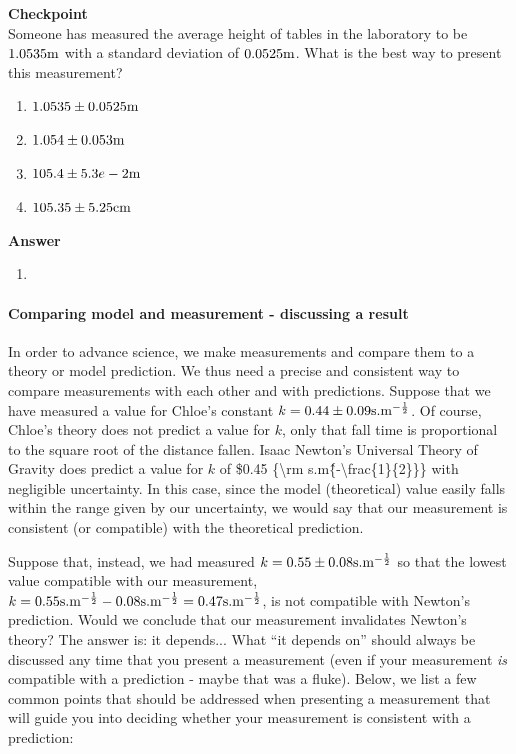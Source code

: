 \begin{framed}
\textbf{Checkpoint}\\
Someone has measured the average height of tables in the laboratory to be $1.0535 {\rm m}$ with a standard deviation of $0.0525 {\rm m}$. What is the best way to present this measurement?

\begin{enumerate}
\item $1.0535\pm 0.0525 {\rm m}$
\item $1.054\pm 0.053 {\rm m}$
\item $105.4\pm 5.3e -2 {\rm m}$
\item $105.35\pm 5.25 {\rm cm}$
\end{enumerate}

\begin{framed}
\textbf{Answer}\\
\begin{enumerate}[resume]
\item
\end{enumerate}
\end{framed}
\end{framed}

\paragraph{Comparing model and measurement - discussing a result}

In order to advance science, we make measurements and compare them to a theory or model prediction. We thus need a precise and consistent way to compare measurements with each other and with predictions. Suppose that we have measured a value for Chloe's constant $k= 0.44 \pm 0.09 {\rm s.m^{ -\frac{1}{2}}}$. Of course, Chloe's theory does not predict a value for $k$, only that fall time is proportional to the square root of the distance fallen. Isaac Newton's Universal Theory of Gravity does predict a value for $k$ of \$0.45 \{{\textbackslash}rm s.m\^\{-{\textbackslash}frac\{1\}\{2\}\}\} with negligible uncertainty. In this case, since the model (theoretical) value easily falls within the range given by our uncertainty, we would say that our measurement is consistent (or compatible) with the theoretical prediction.

Suppose that, instead, we had measured $k=0.55 \pm 0.08 {\rm s.m^{ -\frac{1}{2}}}$ so that the lowest value compatible with our measurement, $k=0.55 {\rm s.m^{ -\frac{1}{2}}} -0.08 {\rm s.m^{ -\frac{1}{2}}}= 0.47 {\rm s.m^{ -\frac{1}{2}}}$, is not compatible with Newton's prediction. Would we conclude that our measurement invalidates Newton's theory? The answer is: it depends... What ``it depends on'' should always be discussed any time that you present a measurement (even if your measurement \textit{is} compatible with a prediction - maybe that was a fluke). Below, we list a few common points that should be addressed when presenting a measurement that will guide you into deciding whether your measurement is consistent with a prediction:


